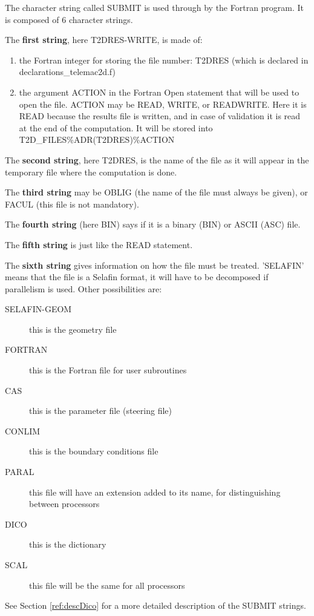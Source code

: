 The character string called SUBMIT is used through \damocles by the Fortran program.
It is composed of 6 character strings.

The \textbf{first string}, here T2DRES-WRITE, is made of:

\begin{enumerate}
\item  the Fortran integer for storing the file number: T2DRES (which is
  declared in declarations\_telemac2d.f)
\item  the argument ACTION in the Fortran Open statement that will be used to
  open the file. ACTION may be READ, WRITE, or READWRITE. Here it is READ
  because the results file is written, and in case of validation it is read at
  the end of the computation. It will be stored into
  T2D\_FILES\%ADR(T2DRES)\%ACTION
\end{enumerate}

The \textbf{second string}, here T2DRES, is the name of the file as it will
appear in the temporary file where the computation is done.

The \textbf{third string} may be OBLIG (the name of the file must always be
given), or FACUL (this file is not mandatory).

The \textbf{fourth string} (here BIN) says if it is a binary (BIN) or ASCII
(ASC) file.

The \textbf{fifth string} is just like the READ statement.

The \textbf{sixth string} gives
information on how the file must be treated. 'SELAFIN' means that the file is a
Selafin format, it will have to be decomposed if parallelism is used. Other
possibilities are:
\begin{description}
  \item [SELAFIN-GEOM] this is the geometry file
  \item [FORTRAN] this is the Fortran file for user subroutines
  \item [CAS] this is the parameter file (steering file)
  \item [CONLIM] this is the boundary conditions file
  \item [PARAL] this file will have an extension added to its name, for
    distinguishing between processors
  \item [DICO] this is the dictionary
  \item [SCAL] this file will be the same for all processors
\end{description}
See Section \ref{ref:descDico} for a more detailed description of the SUBMIT
strings.

